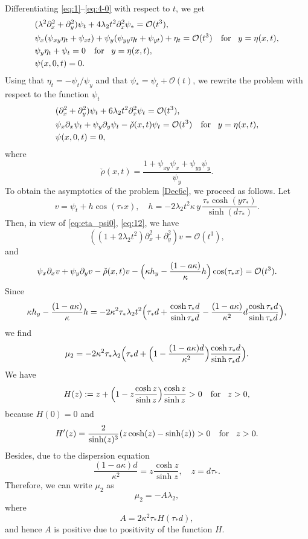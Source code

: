 \documentclass[oneside,a4paper,11pt]{article}
\theoremstyle{thmstyletwo}%
\theoremstyle{thmstylethree}%
\numberwithin{equation}{section}
\def\taust{\tau_{*}}
\def\dUd{\kappa}
\def\Obig{\mathcal{O}}
\begin{document}
Differentiating \eqref{eq:1}--\eqref{eq:4-0} with respect to $t$, we get
\begin{align*}
&(\lambda^2\partial_x^2+\partial_y^2)\psi_t+4\lambda_2t^2\partial_x^2\psi_*=\Obig(t^3),\\
&\psi_x(\psi_{xy}\eta_t+\psi_{xt})+\psi_y(\psi_{yy}\eta_t+\psi_{yt})+\eta_t
=\Obig(t^3)\quad\mbox{for\!}\quad y=\eta(x,t),\\
&\psi_y\eta_t+\psi_t=0\quad\mbox{for\!}\quad y=\eta(x,t),\\
&\psi(x,0,t)=0.
\end{align*}
Using that $\eta_t=-\psi_t/\psi_y$ and that $\psi_*=\psi_t+\Obig(t)$, we rewrite the problem with respect to the function $\psi_t$
\begin{equation}\label{Dec6c}
\begin{aligned}
&(\partial_x^2+\partial_y^2)\psi_t+6\lambda_2t^2\partial_x^2\psi_t=\Obig(t^3),\\
&\psi_x\partial_x\psi_{t}+\psi_y\partial_y\psi_{t}-\check{\rho}(x,t)\psi_t=\Obig(t^3)\quad\mbox{for\!}\quad y=\eta(x,t),\\
&\psi(x,0,t)=0,
\end{aligned}
\end{equation}
where
\begin{equation*}
\check{\rho}(x,t)=\frac{1+\psi_{xy}\psi_x+\psi_{yy}\psi_y}{\psi_y}.
\end{equation*}
To obtain the asymptotics of the problem \eqref{Dec6c}, we proceed as follows. Let
\begin{equation}
\label{eq:vdef}
v=\psi_t+h \cos(\taust x),\quad h=-2\lambda_2t^2\dUd \,y\,\frac{\taust\cosh(y\taust)}{\sinh(d\taust)}.
\end{equation}
Then, in view of \eqref{eq:eta_psi0}, \eqref{eq:12}, we have
\begin{equation*} %
((1+2\lambda_2t^2)\partial_x^2+\partial_y^2)v=\Obig(t^3),
\end{equation*}
and
$$
\psi_x\partial_xv+\psi_y\partial_yv-\check{\rho}(x,t)v-\Bigl(\dUd h_y-\frac{(1-a\dUd)}{\dUd}h\Bigr)\cos(\taust x)=\Obig(t^3).
$$
Since
$$
\dUd h_y-\frac{(1-a\dUd)}{\dUd}h=-2\dUd^2\taust\lambda_2t^2\Bigl(\taust d+\frac{\cosh\taust d}{\sinh\taust d}-\frac{(1-a\dUd)}{\dUd^2}d\frac{\cosh \taust d}{\sinh \taust d} \Bigr),
$$
we find
\begin{equation}
\mu_2=-2\dUd^2\taust\lambda_2\Bigl(\taust d+\Bigl(1-\frac{(1-a\dUd)d}{\dUd^2}\Bigr)\frac{\cosh \taust d}{\sinh \taust d} \Bigr).
\label{eq:mu2def}
\end{equation}
We have
\begin{equation}\label{Dec6ca}
H(z):=z+\Bigl(1-z\frac{\cosh z}{\sinh z}\Bigr)\frac{\cosh z}{\sinh z}>0\quad \mbox{for\!}\quad z>0,
\end{equation}
because $H(0)=0$ and
\begin{equation*}
H'(z)=\frac{2}{\sinh(z)^3}(z\cosh(z)-\sinh(z))>0\quad\mbox{for\!}\quad z>0.
\end{equation*}
Besides, due to the dispersion equation
$$
\frac{(1-a\dUd)d}{\dUd^2}=z\frac{\cosh z}{\sinh z},\quad z=d\taust.
$$
Therefore, we can write $\mu_2$ as
$$
\mu_2=-A\lambda_2,
$$
where 
$$
A=2\dUd^2\taust H(\taust d),
$$
and hence $A$ is positive due to positivity of the function $H$.
\end{document}
